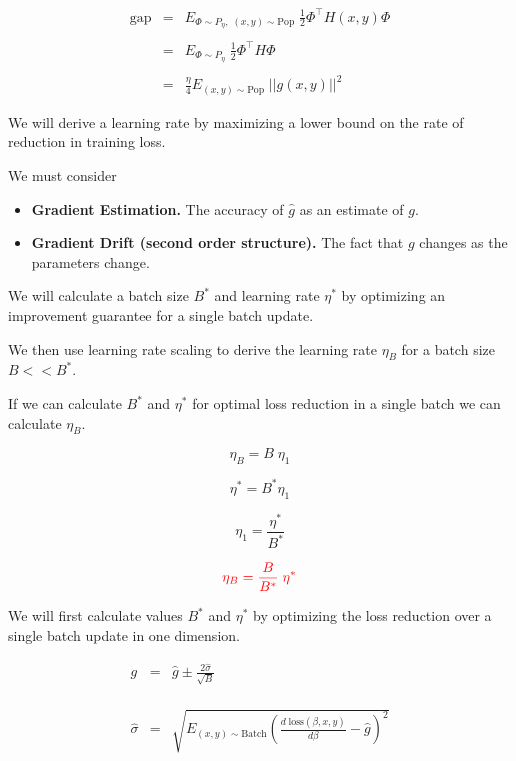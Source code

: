 {

\begin{eqnarray*}
\mathrm{gap} & = & E_{\Phi \sim P_\eta,\;(x,y) \sim \mathrm{Pop} } \;\frac{1}{2}\Phi^\top H(x,y) \Phi \\
 \\
 & = & E_{\Phi \sim P_\eta} \;\frac{1}{2}\Phi^\top H \Phi \\
 \\
 & = & \frac{\eta}{4} E_{(x,y) \sim \mathrm{Pop}}\; ||g(x,y)||^2
 \end{eqnarray*}


\vfill
We will derive a learning rate by maximizing a lower bound on the rate of reduction in training loss.

\vfill
We must consider

\vfill
\begin{itemize}
\item {\bf Gradient Estimation.} The accuracy of $\hat{g}$ as an estimate of $g$.

  \vfill
\item {\bf Gradient Drift (second order structure).} The fact that $g$ changes as the parameters change.
\end{itemize}


We will calculate a batch size $B^*$ and learning rate $\eta^*$ by optimizing an improvement guarantee for a single batch update.

\vfill
We then use learning rate scaling to derive the learning rate  $\eta_B$ for a batch size $B << B^*$.


If we can calculate $B^*$ and $\eta^*$ for optimal loss reduction in a single batch
we can calculate $\eta_B$.

\vfill
$$\eta_B = B\;\eta_1$$

\vfill
$$\eta^* = B^* \eta_1$$

\vfill
$$\eta_1 = \frac{\eta^*}{B^*}$$

\vfill
$${\color{red} \eta_B = \frac{B}{B^*} \;\eta^*}$$


We will first calculate values $B^*$ and $\eta^*$ by optimizing the loss reduction over a single batch update in one dimension.

\vfill
\begin{eqnarray*}
  g & = & \hat{g} \pm \frac{2\hat{\sigma}}{\sqrt{B}} \\
  \\
  \\
  \\
  \hat{\sigma} & = & \sqrt{E_{(x,y) \sim \mathrm{Batch}} \left(\frac{d\;\mathrm{loss}(\beta,x,y)}{d \beta} - \hat{g}\right)^2}
\end{eqnarray*}

}
